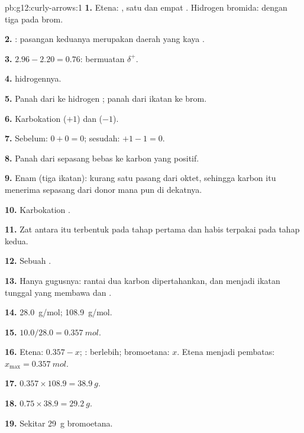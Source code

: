 \begin{solution}{pb:g12:curly-arrows:1}
\textbf{1.} Etena: , satu  dan empat
. Hidrogen bromida:  dengan tiga  pada brom.

\textbf{2.} : pasangan  keduanya merupakan
daerah yang kaya .

\textbf{3.} $2.96 - 2.20 = 0.76$:  bermuatan $\delta^+$.

\textbf{4.}  hidrogennya.

\textbf{5.} Panah dari  ke hidrogen ; panah dari
ikatan  ke brom.

\textbf{6.} Karbokation  ($+1$) dan  ($-1$).

\textbf{7.} Sebelum: $0 + 0 = 0$; sesudah: $+1 - 1 = 0$.

\textbf{8.} Panah dari sepasang  bebas  ke karbon yang
positif.

\textbf{9.} Enam (tiga ikatan): kurang satu pasang dari oktet, sehingga
karbon itu menerima sepasang  dari donor mana pun di dekatnya.

\textbf{10.} Karbokation .

\textbf{11.} Zat antara itu terbentuk pada tahap pertama dan habis
terpakai pada tahap kedua.

\textbf{12.} Sebuah .

\textbf{13.} Hanya gugusnya: rantai dua karbon dipertahankan, dan  menjadi ikatan tunggal yang membawa  dan .

\textbf{14.} \qty{28.0}{g/mol}; \qty{108.9}{g/mol}.

\textbf{15.} $10.0 / 28.0 = \qty{0.357}{mol}$.

\textbf{16.} Etena: $0.357 - x$; : berlebih; bromoetana: $x$.
Etena menjadi pembatas: $x_{\max} = \qty{0.357}{mol}$.

\textbf{17.} $0.357 \times 108.9 = \qty{38.9}{g}$.

\textbf{18.} $0.75 \times 38.9 = \qty{29.2}{g}$.

\textbf{19.} Sekitar \qty{29}{g} bromoetana.
\end{solution}

